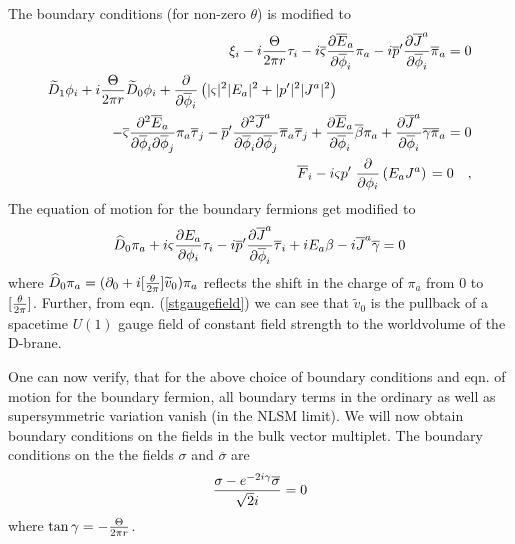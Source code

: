 \documentclass[a4paper,12pt]{article}
\begin{document}
The boundary conditions (for non-zero $\theta$) is modified to
\begin{eqnarray}
&&\xi_i - i {\Theta\over{2\pi r}} \tau_i -i \overline{\varsigma}
{{\partial \overline{E}_a}\over{\partial\overline{\phi}_i}} \pi_a 
-i\overline{p}'{{\partial \overline{J}^a}\over{\partial\overline{\phi}_i}} 
\overline{\pi}_a =0  \\
%
\lefteqn{
\widetilde{D}_1 \phi_i +i {\Theta\over{2\pi r}} \widetilde{D}_0\phi_i
+ {\partial\over{\partial\overline{\phi}_i}} 
\left( |\varsigma|^2|E_a|^2 + |p'|^2|J^a|^2\right) 
}\hspace{0.5in}
  \nonumber \\
&&- \overline{\varsigma}
{{\partial^2 \overline{E}_a}\over{\partial\overline{\phi}_i\partial\overline{\phi}_j}} 
\pi_a \overline{\tau}_j 
-\overline{p}'
{{\partial^2 \overline{J}^a}\over{\partial\overline{\phi}_i
\partial\overline{\phi}_j}} 
\overline{\pi}_a \overline{\tau}_j
+{{\partial \overline{E}_a}\over{\partial \overline{\phi}_i}}
\overline{\beta} \pi_a
+{{\partial \overline{J}^a}\over{\partial \overline{\phi}_i}}
\overline{\gamma}\overline{\pi}_a
=0 
\\
%
&&\overline{F}_i - i \varsigma p' \left.{\partial\over{\partial\phi_i}} \left({E}_a
{J}^a \right) \right.
=0 \quad,
\end{eqnarray}
The equation of motion for the boundary fermions get modified to
\begin{equation}
\widehat{D}_0 \pi_a 
+ i \varsigma{{\partial E_a}\over{\partial\phi_i}} \tau_i
-i \overline{p}'{{\partial \overline{J}^a}\over{\partial\overline{\phi}_i}}
\overline{\tau}_i+iE_a \beta   
-i \overline{J}^a \overline{\gamma} =0
\end{equation} \label{pieqn}
where $\widehat{D}_0 \pi_a = ( \partial_0 + i [{\theta\over{2\pi}}]
\widetilde{v}_0)\pi_a$ 
reflects the  shift in the charge of $\pi_a$ from $0$ to
$[{\theta\over{2\pi}}]$. Further, from eqn. (\ref{stgaugefield}) we can see
that $\widetilde{v}_0$ is the pullback of a spacetime  $U(1)$ gauge field of
constant field strength to the worldvolume of the  D-brane.

One can now verify, that  for the above choice of boundary conditions
and eqn. of motion for the boundary fermion, all boundary terms in the
ordinary as well as supersymmetric variation vanish (in the NLSM limit).
We will now obtain boundary conditions on the fields in the bulk vector
multiplet. The boundary conditions on the the fields $\sigma$ and
$\overline{\sigma}$ are
\begin{equation}
{{\sigma - e^{-2i\gamma} \overline{\sigma}}\over{\sqrt2 i}} 
=0
\end{equation}
where $\tan \gamma =-{\Theta\over{2\pi r}}$.
\end{document}
